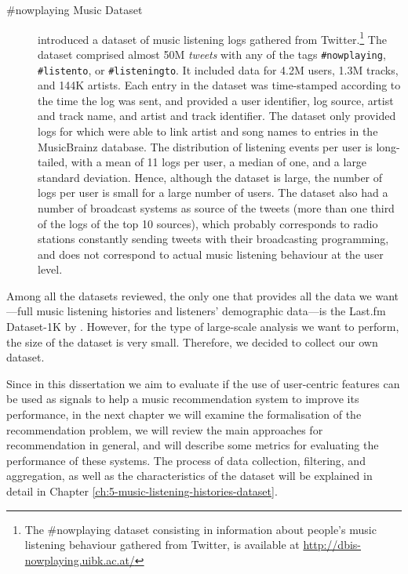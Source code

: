 \begin{description}
\item [\#nowplaying Music Dataset] \textcite{zangerle14nowplaying} introduced a dataset of music listening logs gathered from Twitter.\footnote{The \#nowplaying dataset consisting in information about people's music listening behaviour gathered from Twitter, is available at \url{http://dbis-nowplaying.uibk.ac.at/}} The dataset comprised almost 50M \emph{tweets} with any of the tags \texttt{\#nowplaying}, \texttt{\#listento}, or \texttt{\#listeningto}. It included data for 4.2M users, 1.3M tracks, and 144K artists. 
Each entry in the dataset was time-stamped according to the time the log was sent, and provided a user identifier, log source, artist and track name, and artist and track identifier. 
The dataset only provided logs for which \citeauthor{zangerle14nowplaying} were able to link artist and song names to entries in the MusicBrainz database.
The distribution of listening events per user is long-tailed, with a mean of 11 logs per user, a median of one, and a large standard deviation. Hence, although the dataset is large, the number of logs per user is small for a large number of users. The dataset also had a number of broadcast systems as source of the tweets (more than one third of the logs of the top 10 sources), which probably corresponds to radio stations constantly sending tweets with their broadcasting programming, and does not correspond to actual music listening behaviour at the user level.

\end{description}





Among all the datasets reviewed, the only one that provides all the data we want---full music listening histories and listeners' demographic data---is the Last.fm Dataset-1K by \textcite{celma10music}. However, for the type of large-scale analysis we want to perform, the size of the dataset is very small. Therefore, we decided to collect our own dataset. 

Since in this dissertation we aim to evaluate if the use of user-centric features can be used as signals to help a music recommendation system to improve its performance, in the next chapter we will examine the formalisation of the recommendation problem, we will review the main approaches for recommendation in general, and will describe some metrics for evaluating the performance of these systems.
The process of data collection, filtering, and aggregation, as well as the characteristics of the dataset will be explained in detail in Chapter \ref{ch:5-music-listening-histories-dataset}.





